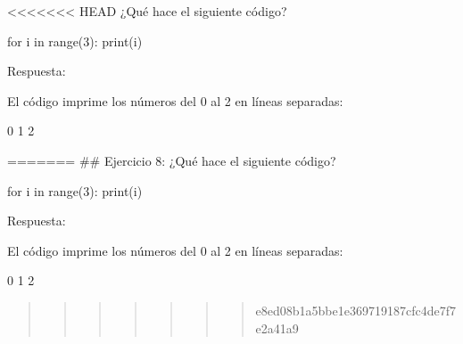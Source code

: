 \documentclass[
  a4paper,
  DIV=11,
  numbers=noendperiod,
  onepage,
  openany]{scrreprt}
\newenvironment{Shaded}{\begin{snugshade}}{\end{snugshade}}
\newcommand{\BuiltInTok}[1]{\textcolor[rgb]{0.00,0.23,0.31}{#1}}
\newcommand{\ControlFlowTok}[1]{\textcolor[rgb]{0.00,0.23,0.31}{#1}}
\newcommand{\DecValTok}[1]{\textcolor[rgb]{0.68,0.00,0.00}{#1}}
\newcommand{\ExtensionTok}[1]{\textcolor[rgb]{0.00,0.23,0.31}{#1}}
\newcommand{\KeywordTok}[1]{\textcolor[rgb]{0.00,0.23,0.31}{#1}}
\newcommand{\NormalTok}[1]{\textcolor[rgb]{0.00,0.23,0.31}{#1}}
\begin{document}
\textless\textless\textless\textless\textless\textless\textless{} HEAD
¿Qué hace el siguiente código?

\begin{Shaded}
\begin{Highlighting}[]
\ControlFlowTok{for}\NormalTok{ i }\KeywordTok{in} \BuiltInTok{range}\NormalTok{(}\DecValTok{3}\NormalTok{):}
    \BuiltInTok{print}\NormalTok{(i)}
\end{Highlighting}
\end{Shaded}

Respuesta:

El código imprime los números del 0 al 2 en líneas separadas:

\begin{Shaded}
\begin{Highlighting}[]
\ExtensionTok{0}
\ExtensionTok{1}
\ExtensionTok{2}
\end{Highlighting}
\end{Shaded}

======= \#\# Ejercicio 8: ¿Qué hace el siguiente código?

\begin{Shaded}
\begin{Highlighting}[]
\ControlFlowTok{for}\NormalTok{ i }\KeywordTok{in} \BuiltInTok{range}\NormalTok{(}\DecValTok{3}\NormalTok{):}
    \BuiltInTok{print}\NormalTok{(i)}
\end{Highlighting}
\end{Shaded}

Respuesta:

El código imprime los números del 0 al 2 en líneas separadas:

\begin{Shaded}
\begin{Highlighting}[]
\ExtensionTok{0}
\ExtensionTok{1}
\ExtensionTok{2}
\end{Highlighting}
\end{Shaded}

\begin{quote}
\begin{quote}
\begin{quote}
\begin{quote}
\begin{quote}
\begin{quote}
\begin{quote}
e8ed08b1a5bbe1e369719187cfc4de7f7e2a41a9
\end{quote}
\end{quote}
\end{quote}
\end{quote}
\end{quote}
\end{quote}
\end{quote}
\end{document}
